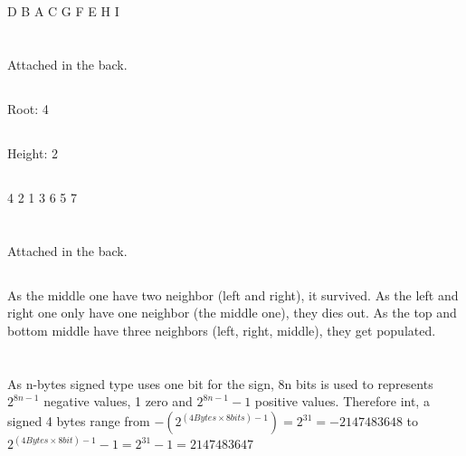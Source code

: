 \documentclass{article}
\begin{document}
\subsection{}
D B A C G F E H I

\section{}
\subsection{}
Attached in the back.
\subsection{}
Root: 4
\subsection{}
Height: 2
\subsection{}
4 2 1 3 6 5 7

\section{}


\section{}
\section{}
Attached in the back.
\setcounter{subsection}{3}
\subsection{}
As the middle one have two neighbor (left and right), it survived. As the left and right one only have one neighbor (the middle one), they dies out. As the top and bottom middle have three neighbors (left, right, middle), they get populated.

\section{}
\subsection{}
As n-bytes signed type uses one bit for the sign, 8n bits is used to represents $2^{8n-1}$ negative values, 1 zero and $2^{8n-1}-1$ positive values. Therefore int, a signed 4 bytes range from $-(2^{(4Bytes\times8bits)-1})=2^{31}=-2147483648$ to $2^{(4Bytes\times8bit)-1}-1=2^{31}-1=2147483647$
\end{document}
